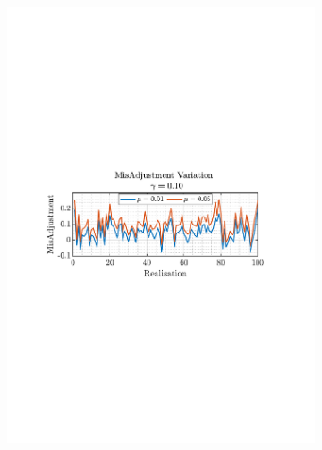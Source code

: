 \documentclass[12pt]{article}
\numberwithin{equation}{section}
\begin{document}
			\begin{figure}[H]
				\centering
				\begin{subfigure}{0.49\textwidth}
					\centering
					\includegraphics[trim={2.2cm 11.2cm 3.00cm  11.2cm}, clip, width=\textwidth]{../MATLAB/figures/q2_1f_fig01.pdf} 
					\captionsetup{justification=centering}
				\end{subfigure}
				\begin{subfigure}{0.49\textwidth}
					\centering

\end{subfigure}
\end{figure}
\end{document}
